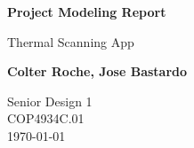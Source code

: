 \begin{titlepage}
    \begin{center}
        \vspace*{1cm}
            
        \Huge
        \textbf{Project Modeling Report}
            
        \vspace{0.5cm}
        \LARGE
        Thermal Scanning App
            
        \vspace{1.5cm}
            
        \textbf{Colter Roche, Jose Bastardo}
            
        \vfill
          
        \Large
        Senior Design 1\\
        COP4934C.01\\
        \today
            
    \end{center}
\end{titlepage}